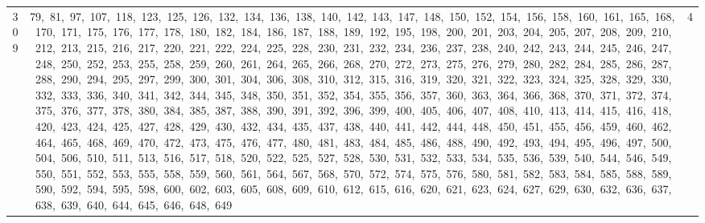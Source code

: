 \begin{longtable}{c|p{}|r}
309 & 79,\ 81,\ 97,\ 107,\ 118,\ 123,\ 125,\ 126,\ 132,\ 134,\ 136,\ 138,\ 140,\ 142,\ 143,\ 147,\ 148,\ 150,\ 152,\ 154,\ 156,\ 158,\ 160,\ 161,\ 165,\ 168,\ 170,\ 171,\ 175,\ 176,\ 177,\ 178,\ 180,\ 182,\ 184,\ 186,\ 187,\ 188,\ 189,\ 192,\ 195,\ 198,\ 200,\ 201,\ 203,\ 204,\ 205,\ 207,\ 208,\ 209,\ 210,\ 212,\ 213,\ 215,\ 216,\ 217,\ 220,\ 221,\ 222,\ 224,\ 225,\ 228,\ 230,\ 231,\ 232,\ 234,\ 236,\ 237,\ 238,\ 240,\ 242,\ 243,\ 244,\ 245,\ 246,\ 247,\ 248,\ 250,\ 252,\ 253,\ 255,\ 258,\ 259,\ 260,\ 261,\ 264,\ 265,\ 266,\ 268,\ 270,\ 272,\ 273,\ 275,\ 276,\ 279,\ 280,\ 282,\ 284,\ 285,\ 286,\ 287,\ 288,\ 290,\ 294,\ 295,\ 297,\ 299,\ 300,\ 301,\ 304,\ 306,\ 308,\ 310,\ 312,\ 315,\ 316,\ 319,\ 320,\ 321,\ 322,\ 323,\ 324,\ 325,\ 328,\ 329,\ 330,\ 332,\ 333,\ 336,\ 340,\ 341,\ 342,\ 344,\ 345,\ 348,\ 350,\ 351,\ 352,\ 354,\ 355,\ 356,\ 357,\ 360,\ 363,\ 364,\ 366,\ 368,\ 370,\ 371,\ 372,\ 374,\ 375,\ 376,\ 377,\ 378,\ 380,\ 384,\ 385,\ 387,\ 388,\ 390,\ 391,\ 392,\ 396,\ 399,\ 400,\ 405,\ 406,\ 407,\ 408,\ 410,\ 413,\ 414,\ 415,\ 416,\ 418,\ 420,\ 423,\ 424,\ 425,\ 427,\ 428,\ 429,\ 430,\ 432,\ 434,\ 435,\ 437,\ 438,\ 440,\ 441,\ 442,\ 444,\ 448,\ 450,\ 451,\ 455,\ 456,\ 459,\ 460,\ 462,\ 464,\ 465,\ 468,\ 469,\ 470,\ 472,\ 473,\ 475,\ 476,\ 477,\ 480,\ 481,\ 483,\ 484,\ 485,\ 486,\ 488,\ 490,\ 492,\ 493,\ 494,\ 495,\ 496,\ 497,\ 500,\ 504,\ 506,\ 510,\ 511,\ 513,\ 516,\ 517,\ 518,\ 520,\ 522,\ 525,\ 527,\ 528,\ 530,\ 531,\ 532,\ 533,\ 534,\ 535,\ 536,\ 539,\ 540,\ 544,\ 546,\ 549,\ 550,\ 551,\ 552,\ 553,\ 555,\ 558,\ 559,\ 560,\ 561,\ 564,\ 567,\ 568,\ 570,\ 572,\ 574,\ 575,\ 576,\ 580,\ 581,\ 582,\ 583,\ 584,\ 585,\ 588,\ 589,\ 590,\ 592,\ 594,\ 595,\ 598,\ 600,\ 602,\ 603,\ 605,\ 608,\ 609,\ 610,\ 612,\ 615,\ 616,\ 620,\ 621,\ 623,\ 624,\ 627,\ 629,\ 630,\ 632,\ 636,\ 637,\ 638,\ 639,\ 640,\ 644,\ 645,\ 646,\ 648,\ 649 & 4 \\

\end{longtable}
